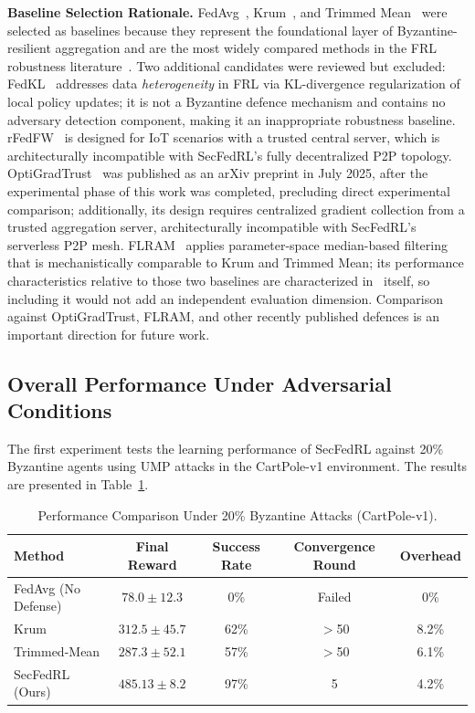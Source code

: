 \documentclass[12pt,a4paper]{article}
\begin{document}
\textbf{Baseline Selection Rationale.} FedAvg~\cite{ref25}, Krum~\cite{ref19}, and
Trimmed Mean~\cite{ref22} were selected as baselines because they represent the
foundational layer of Byzantine-resilient aggregation and are the most widely compared
methods in the FRL robustness literature~\cite{ref15,ref5}. Two additional candidates
were reviewed but excluded: FedKL~\cite{ref17} addresses data \emph{heterogeneity} in
FRL via KL-divergence regularization of local policy updates; it is not a Byzantine
defence mechanism and contains no adversary detection component, making it an
inappropriate robustness baseline. rFedFW~\cite{ref18} is designed for IoT scenarios
with a trusted central server, which is architecturally incompatible with SecFedRL's
fully decentralized P2P topology. OptiGradTrust~\cite{ref1} was published as an arXiv
preprint in July 2025, after the experimental phase of this work was completed,
precluding direct experimental comparison; additionally, its design requires
centralized gradient collection from a trusted aggregation server, architecturally
incompatible with SecFedRL's serverless P2P mesh. FLRAM~\cite{ref27} applies
parameter-space median-based filtering that is mechanistically comparable to Krum and
Trimmed Mean; its performance characteristics relative to those two baselines are
characterized in~\cite{ref27} itself, so including it would not add an independent
evaluation dimension. Comparison against OptiGradTrust, FLRAM, and other recently
published defences is an important direction for future work.

\subsection{Overall Performance Under Adversarial Conditions}

The first experiment tests the learning performance of SecFedRL against 20\% Byzantine
agents using UMP attacks in the CartPole-v1 environment. The results are presented in
Table~\ref{tab:cartpole_perf}.

\begin{table}[htbp]
\centering
\caption{Performance Comparison Under 20\% Byzantine Attacks (CartPole-v1).}
\label{tab:cartpole_perf}
\begin{tabular}{lcccc}
\toprule
\textbf{Method} & \textbf{Final Reward} & \textbf{Success Rate} &
\textbf{Convergence Round} & \textbf{Overhead} \\
\midrule
FedAvg (No Defense)  & $78.0 \pm 12.3$    & 0\%  & Failed & 0\%   \\
Krum                 & $312.5 \pm 45.7$   & 62\% & $>$50  & 8.2\% \\
Trimmed-Mean         & $287.3 \pm 52.1$   & 57\% & $>$50  & 6.1\% \\
SecFedRL (Ours)      & $485.13 \pm 8.2$   & 97\% & 5      & 4.2\% \\
\bottomrule
\end{tabular}
\end{table}
\end{document}
